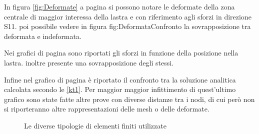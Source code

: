 In figura \ref{fig:Deformate} a pagina \pageref{fig:Deformate} si possono notare le deformate della zona centrale di maggior interessa della lastra e con riferimento agli sforzi in direzione S11. 
\e poi possibile vedere in figura {fig:DeformataConfronto} la sovrapposizione tra deformata e indeformata.

Nei grafici di pagina \pageref{fig:GraficoMesh1} sono riportati gli sforzi in funzione della posizione nella lastra. \e inoltre presente una sovrapposizione degli stessi.

Infine nel grafico di pagina \pageref{GraficoConfrontocps8} è riportato il confronto tra la soluzione analitica calcolata secondo le \eqref{kt1}.
Per maggior maggior infittimento di quest'ultimo grafico sono state fatte altre prove con diverse distanze tra i nodi, di cui però non si riporteranno altre rappresentazioni delle mesh o delle deformate.
\begin{figure}[htp]
\centering
{} %
\caption{Le diverse tipologie di elementi finiti utilizzate}
\label{fig:cps}
\end{figure}
